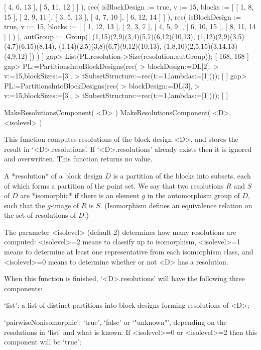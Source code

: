                   [ 4, 6, 13 ], [ 5, 11, 12 ] ] ), 
          rec( isBlockDesign := true, v := 15, 
              blocks := [ [ 1, 8, 15 ], [ 2, 9, 11 ], [ 3, 5, 13 ], 
                  [ 4, 7, 10 ], [ 6, 12, 14 ] ] ), 
          rec( isBlockDesign := true, v := 15, 
              blocks := [ [ 1, 12, 13 ], [ 2, 3, 7 ], [ 4, 5, 9 ], 
                  [ 6, 10, 15 ], [ 8, 11, 14 ] ] ) ], 
      autGroup := Group([ (1,15)(2,9)(3,4)(5,7)(6,12)(10,13), 
          (1,12)(2,9)(3,5)(4,7)(6,15)(8,14), 
          (1,14)(2,5)(3,8)(6,7)(9,12)(10,13), 
          (1,8,10)(2,5,15)(3,14,13)(4,9,12) ]) ) ]
gap> List(PL,resolution->Size(resolution.autGroup));
[ 168, 168 ]
gap> PL:=PartitionsIntoBlockDesigns(rec(
>       blockDesign:=DL[2],
>       v:=15,blockSizes:=[3],
>       tSubsetStructure:=rec(t:=1,lambdas:=[1])));
[  ]
gap> PL:=PartitionsIntoBlockDesigns(rec(
>       blockDesign:=DL[3],
>       v:=15,blockSizes:=[3],
>       tSubsetStructure:=rec(t:=1,lambdas:=[1])));
[  ]
\endexample


\>MakeResolutionsComponent( <D> )
\>MakeResolutionsComponent( <D>, <isolevel> )

This function computes resolutions of the block design <D>, and stores
the result in `<D>.resolutions'. If `<D>.resolutions' already exists
then it is ignored and overwritten. This function returns no value.
 
A *resolution* of a block design $D$ is a partition of the blocks into
subsets, each of which forms a partition of the point set.  We say that
two resolutions $R$ and $S$ of $D$ are *isomorphic* if there is an element
$g$ in the automorphism group of $D$, such that the $g$-image of $R$
is $S$. (Isomorphism defines an equivalence relation on the set of
resolutions of $D$.)

The parameter <isolevel> (default 2) determines how many resolutions are
computed: <isolevel>=2 means to classify up to isomorphism, <isolevel>=1
means to determine at least one representative from each isomorphism
class, and <isolevel>=0 means to determine whether or not <D> has
a resolution.

When this function is finished, `<D>.resolutions' will have the following
three components:

`list': a list of distinct partitions into block designs forming resolutions
of <D>;

`pairwiseNonisomorphic': `true', `false' or `"unknown"', depending on the
resolutions in `list' and what is known. If <isolevel>=0 or <isolevel>=2
then this component will be `true';

